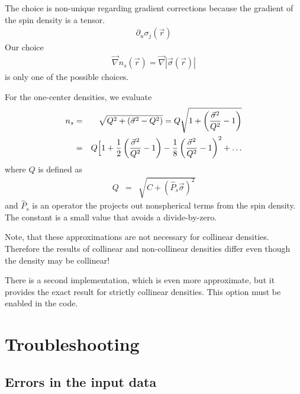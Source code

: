 \documentclass[final,12pt]{article}
\begin{document}
{{{The choice is non-unique regarding gradient corrections because the
gradient of the spin density is a tensor.
\begin{eqnarray*}
\partial_u\sigma_j(\vec{r})
\end{eqnarray*}
Our choice
\begin{eqnarray*}
\vec{\nabla}n_s(\vec{r})=\vec{\nabla}|\vec{\sigma}(\vec{r})|
\end{eqnarray*}
is only one of the possible choices. 


For the one-center densities, we evaluate
\begin{eqnarray*}
n_s&=&\sqrt{Q^2+\left(\vec{\sigma}^2-Q^2\right)}
=Q\sqrt{1+\left(\frac{\vec{\sigma}^2}{Q^2}-1\right)}
\\
&=&Q\Bigl[1+\frac{1}{2}\left(\frac{\vec{\sigma}^2}{Q^2}-1\right)
-\frac{1}{8}\left(\frac{\vec{\sigma}^2}{Q^2}-1\right)^2+\ldots
\end{eqnarray*}
where $Q$ is defined as
\begin{eqnarray*}
Q&=&\sqrt{C+(\hat{P}_s\vec{\sigma})^2}
\end{eqnarray*}
and $\hat{P}_s$ is an operator the projects out nonspherical terms
from the spin density. The constant is a small value that avoids a 
divide-by-zero.

Note, that these approximations are not necessary for collinear
densities. Therefore the results of collinear and non-collinear
densities differ even though the density may be collinear!

There is a second implementation, which is even more approximate, but
it provides the exact result for strictly collinear densities. This
option must be enabled in the code.




\newpage
\section{Troubleshooting}

\subsection{Errors in the input data}

}}}
\end{document}
